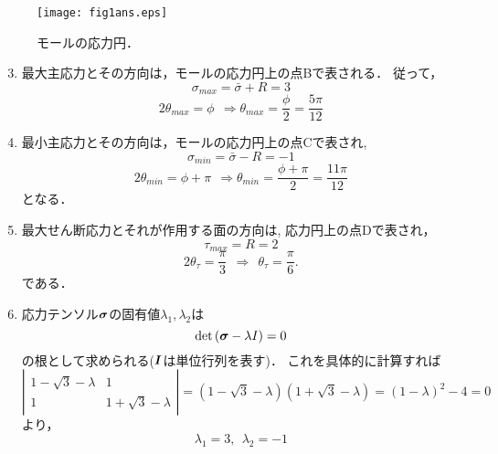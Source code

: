 \documentclass[10pt,a4j]{jarticle}
\begin{document}
\begin{figure}[h]
	\begin{center}
	\texttt{[image: fig1ans.eps]} 
	\end{center}
	\caption{モールの応力円．} 
	\label{fig:fig1}
\end{figure}
%
\begin{enumerate}
\setcounter{enumi}{2}
\item
最大主応力とその方向は，モールの応力円上の点Bで表される． 従って，
\begin{equation}
	\sigma_{max}=\bar\sigma+R=3
\end{equation}
\begin{equation}
	2\theta_{max}=\phi 
	\ \ \Rightarrow 	
	\theta_{max}=\frac{\phi}{2} =\frac{5\pi}{12} 
\end{equation}
\item
最小主応力とその方向は，モールの応力円上の点Cで表され, 
\begin{equation}
	\sigma_{min}=\bar\sigma-R=-1
\end{equation}
\begin{equation}
	2\theta_{min}=\phi+\pi 
	\ \ \Rightarrow 	
	\theta_{min}=\frac{\phi+\pi}{2} =\frac{11\pi}{12} 
\end{equation}
となる．
\item
最大せん断応力とそれが作用する面の方向は, 応力円上の点Dで表され，
\begin{equation}
	\tau_{max}=R=2
\end{equation}
\begin{equation}
	2\theta_{\tau}=\frac{\pi}{3}  \ \ \Rightarrow \ \ 
	\theta_{\tau}=\frac{\pi}{6}.
\end{equation}
である．
\item
応力テンソル$\mbox{\boldmath $\sigma$}$の固有値$\lambda_1,\lambda_2$は
\begin{equation}
	\det \left( \mbox{\boldmath $\sigma$}-\lambda I  \right) =0
\end{equation}
の根として求められる($\mbox{\boldmath $I$}$は単位行列を表す)．
これを具体的に計算すれば
\begin{equation}
	\left| 
		\begin{array}{cc}
		1-\sqrt{3}-\lambda & 1 \\
		1 & 1+\sqrt{3}-\lambda 
		\end{array}
	\right|
	=
		(1-\sqrt{3}-\lambda)(1+\sqrt{3}-\lambda )
	=(1-\lambda)^2-4=0
\end{equation}
より，
\begin{equation}
	\lambda_1 = 3, \ \ \lambda_2 = -1

\end{equation}
\end{enumerate}
\end{document}
